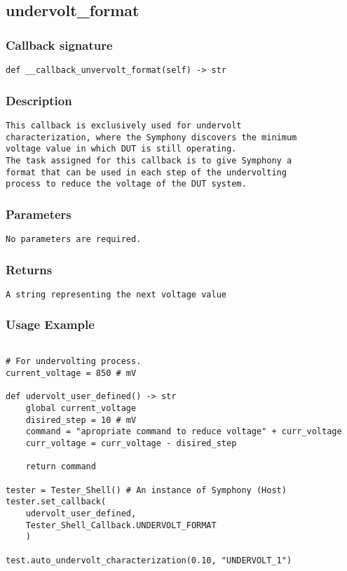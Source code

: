 \subsection{undervolt\_format}

\subsubsection{Callback signature}
\begin{lstlisting}
def __callback_unvervolt_format(self) -> str
\end{lstlisting}

\subsubsection{Description}
\begin{lstlisting}[mathescape=true, keywordstyle=\color{black}, showstringspaces=false]
This callback is exclusively used for undervolt 
characterization, where the Symphony discovers the minimum 
voltage value in which DUT is still operating.
The task assigned for this callback is to give Symphony a 
format that can be used in each step of the undervolting 
process to reduce the voltage of the DUT system.
\end{lstlisting}

\subsubsection{Parameters}
\begin{lstlisting}[mathescape=true, keywordstyle=\color{black}]
No parameters are required.
\end{lstlisting}

\subsubsection{Returns}
\begin{lstlisting}[mathescape=true, keywordstyle=\color{black}]
A string representing the next voltage value
\end{lstlisting}

\subsubsection{Usage Example}
\begin{lstlisting}

# For undervolting process.
current_voltage = 850 # mV

def udervolt_user_defined() -> str
    global current_voltage
    disired_step = 10 # mV
    command = "apropriate command to reduce voltage" + curr_voltage
    curr_voltage = curr_voltage - disired_step 

    return command

tester = Tester_Shell() # An instance of Symphony (Host)
tester.set_callback(
    udervolt_user_defined,
    Tester_Shell_Callback.UNDERVOLT_FORMAT
    )

test.auto_undervolt_characterization(0.10, "UNDERVOLT_1")

\end{lstlisting}
